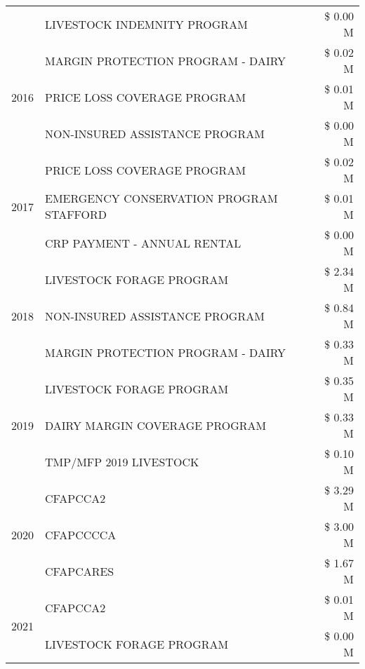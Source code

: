 \begin{tabular}{llr}
 & LIVESTOCK INDEMNITY PROGRAM & \$ 0.00 M \\
\cline{1-3}
\multirow[t]{3}{*}{2016} & MARGIN PROTECTION PROGRAM - DAIRY & \$ 0.02 M \\
 & PRICE LOSS COVERAGE PROGRAM & \$ 0.01 M \\
 & NON-INSURED ASSISTANCE PROGRAM & \$ 0.00 M \\
\cline{1-3}
\multirow[t]{3}{*}{2017} & PRICE LOSS COVERAGE PROGRAM & \$ 0.02 M \\
 & EMERGENCY CONSERVATION PROGRAM STAFFORD & \$ 0.01 M \\
 & CRP PAYMENT - ANNUAL RENTAL & \$ 0.00 M \\
\cline{1-3}
\multirow[t]{3}{*}{2018} & LIVESTOCK FORAGE PROGRAM & \$ 2.34 M \\
 & NON-INSURED ASSISTANCE PROGRAM & \$ 0.84 M \\
 & MARGIN PROTECTION PROGRAM - DAIRY & \$ 0.33 M \\
\cline{1-3}
\multirow[t]{3}{*}{2019} & LIVESTOCK FORAGE PROGRAM & \$ 0.35 M \\
 & DAIRY MARGIN COVERAGE PROGRAM & \$ 0.33 M \\
 & TMP/MFP 2019 LIVESTOCK & \$ 0.10 M \\
\cline{1-3}
\multirow[t]{3}{*}{2020} & CFAPCCA2 & \$ 3.29 M \\
 & CFAPCCCCA & \$ 3.00 M \\
 & CFAPCARES & \$ 1.67 M \\
\cline{1-3}
\multirow[t]{2}{*}{2021} & CFAPCCA2 & \$ 0.01 M \\
 & LIVESTOCK FORAGE PROGRAM & \$ 0.00 M \\
\cline{1-3}
\bottomrule
\end{tabular}
